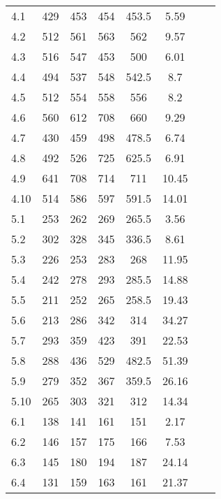 \begin{table}[H]
\begin{center}
{\begin{tabular*}{1\textwidth}{@{\extracolsep{\fill}} l l c c c c c c }
			\hline
			\hline
			   4.1 & 429 & 453 & 454 & 453.5 & 5.59& \\
                            4.2 & 512 & 561 & 563 & 562 & 9.57& \\
                            4.3 & 516 & 547 & 453 & 500 & 6.01& \\
                            4.4 & 494 & 537 & 548 & 542.5 & 8.7& \\
                            4.5 & 512 & 554 & 558 & 556 & 8.2& \\
                            4.6 & 560 & 612 & 708 & 660 & 9.29& \\
                            4.7 & 430 & 459 & 498 & 478.5 & 6.74& \\
                            4.8 & 492 & 526 & 725 & 625.5 & 6.91& \\
                            4.9 & 641 & 708 & 714 & 711 & 10.45& \\
                            4.10 & 514 & 586 & 597 & 591.5 & 14.01& \\
			   \hline
                            5.1 & 253 & 262 & 269 & 265.5 & 3.56& \\
                            5.2 & 302 & 328 & 345 & 336.5 & 8.61& \\
                            5.3 & 226 & 253 & 283 & 268 & 11.95& \\
                            5.4 & 242 & 278 & 293 & 285.5 & 14.88& \\
                            5.5 & 211 & 252 & 265 & 258.5 & 19.43& \\
                            5.6 & 213 & 286 & 342 & 314 & 34.27& \\
                            5.7 & 293 & 359 & 423 & 391 & 22.53& \\
                            5.8 & 288 & 436 & 529 & 482.5 & 51.39& \\
                            5.9 & 279 & 352 & 367 & 359.5 & 26.16& \\
                            5.10 & 265 & 303 & 321 & 312 & 14.34& \\
			   \hline
                            6.1 & 138 & 141 & 161 & 151 & 2.17& \\
                            6.2 & 146 & 157 & 175 & 166 & 7.53& \\
                            6.3 & 145 & 180 & 194 & 187 & 24.14& \\
                            6.4 & 131 & 159 & 163 & 161 & 21.37& \\

\end{tabular*}}
\end{center}
\end{table}
